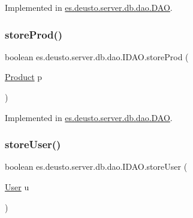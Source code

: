 Implemented in \hyperlink{classes_1_1deusto_1_1server_1_1db_1_1dao_1_1_d_a_o_a0cfb218b648ebc99aed950614173b6c6}{es.\+deusto.\+server.\+db.\+dao.\+D\+AO}.

\mbox{\label{interfacees_1_1deusto_1_1server_1_1db_1_1dao_1_1_i_d_a_o_a1f6d1e58c88fb3a24021f94de5e70056}} 
\subsubsection{\texorpdfstring{store\+Prod()}{storeProd()}}
{\footnotesize\ttfamily boolean es.\+deusto.\+server.\+db.\+dao.\+I\+D\+A\+O.\+store\+Prod (\begin{DoxyParamCaption}\item[{\hyperlink{classes_1_1deusto_1_1server_1_1db_1_1data_1_1_product}{Product}}]{p }\end{DoxyParamCaption})}



Implemented in \hyperlink{classes_1_1deusto_1_1server_1_1db_1_1dao_1_1_d_a_o_a345f30d95426e1cc8bd845949978dd1c}{es.\+deusto.\+server.\+db.\+dao.\+D\+AO}.

\mbox{\label{interfacees_1_1deusto_1_1server_1_1db_1_1dao_1_1_i_d_a_o_ab943216560f43595a852b406dcd394a4}} 
\subsubsection{\texorpdfstring{store\+User()}{storeUser()}}
{\footnotesize\ttfamily boolean es.\+deusto.\+server.\+db.\+dao.\+I\+D\+A\+O.\+store\+User (\begin{DoxyParamCaption}\item[{\hyperlink{classes_1_1deusto_1_1server_1_1db_1_1data_1_1_user}{User}}]{u }\end{DoxyParamCaption})}



